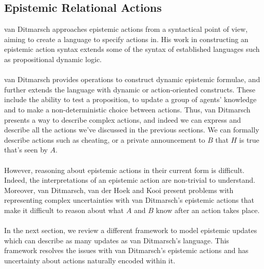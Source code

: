 \documentclass[12pt, a4paper, titlepage]{scrartcl}
\begin{document}
\subsection{Epistemic Relational Actions} \label{epi_acts}
van Ditmarsch approaches epistemic actions from a syntactical point of view,
aiming to create a language to specify actions in.
His work in constructing an epistemic action syntax extends some of the
syntax of established languages such as propositional dynamic
logic\cite{ditmarsch99knowledge,ditmarsch2002dga}.\\
\\
van Ditmarsch provides operations to construct dynamic epistemic formulae, and
further extends the language with dynamic or action-oriented constructs.
These include the ability to test a proposition, to update a group of agents'
knowledge and to make a non-deterministic choice between actions.
Thus, van Ditmarsch presents a way to describe complex actions, and indeed we can
express and describe all the actions we've discussed in the previous sections.
We can formally describe actions such as cheating, or a private
announcement to $B$ that $H$ is true that's seen by $A$.\\
\\
However, reasoning about epistemic actions in their current form is difficult.
Indeed, the interpretations of an epistemic action are non-trivial to
understand.
Moreover, van Ditmarsch, van der Hoek and Kooi present problems with
representing complex uncertainties with van Ditmarsch's epistemic actions that make it difficult
to reason about what $A$ and $B$ know after an action takes place.\\
\\
In the next section, we review a different framework to model epistemic updates
which can describe as many updates as van Ditmarsch's language.
This framework resolves the issues with van Ditmarsch's epistemic actions and
has uncertainty about actions naturally encoded within it.
\end{document}
